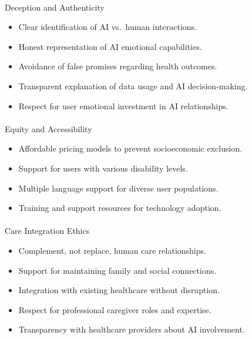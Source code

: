 \documentclass[
  letterpaper,
  DIV=11,
  numbers=noendperiod]{scrartcl}
\makeatletter
\let\oldparagraph\paragraph
\renewcommand{\paragraph}{
    \@ifstar
      \xxxParagraphStar
      \xxxParagraphNoStar
  }
\newcommand{\xxxParagraphStar}[1]{\oldparagraph*{#1}\mbox{}}
\newcommand{\xxxParagraphNoStar}[1]{\oldparagraph{#1}\mbox{}}
\providecommand{\tightlist}{%
  \setlength{\itemsep}{0pt}\setlength{\parskip}{0pt}}\usepackage{longtable,booktabs,array}
\makeatother
\begin{document}
\paragraph{Deception and Authenticity}\label{deception-and-authenticity}

\begin{itemize}
\tightlist
\item
  Clear identification of AI vs.~human interactions.
\item
  Honest representation of AI emotional capabilities.
\item
  Avoidance of false promises regarding health outcomes.
\item
  Transparent explanation of data usage and AI decision-making.
\item
  Respect for user emotional investment in AI relationships.
\end{itemize}

\paragraph{Equity and Accessibility}\label{equity-and-accessibility}

\begin{itemize}
\tightlist
\item
  Affordable pricing models to prevent socioeconomic exclusion.
\item
  Support for users with various disability levels.
\item
  Multiple language support for diverse user populations.
\item
  Training and support resources for technology adoption.
\end{itemize}

\paragraph{Care Integration Ethics}\label{care-integration-ethics}

\begin{itemize}
\tightlist
\item
  Complement, not replace, human care relationships.
\item
  Support for maintaining family and social connections.
\item
  Integration with existing healthcare without disruption.
\item
  Respect for professional caregiver roles and expertise.
\item
  Transparency with healthcare providers about AI involvement.
\end{itemize}
\end{document}
